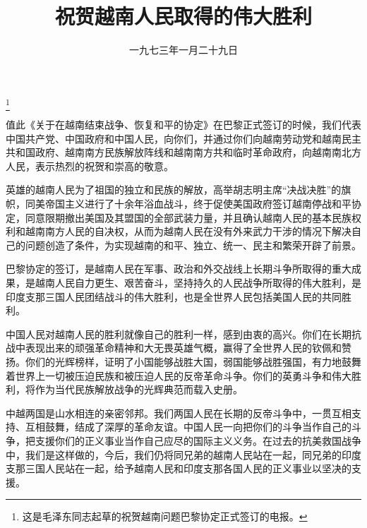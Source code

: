 
\title{祝贺越南人民取得的伟大胜利}
\date{一九七三年一月二十九日}
\thanks{这是毛泽东同志起草的祝贺越南问题巴黎协定正式签订的电报。}
\maketitle










值此《关于在越南结束战争、恢复和平的协定》在巴黎正式签订的时候，我们代表中国共产党、中国政府和中国人民，向你们，并通过你们向越南劳动党和越南民主共和国政府、越南南方民族解放阵线和越南南方共和临时革命政府，向越南南北方人民，表示热烈的祝贺和崇高的敬意。

英雄的越南人民为了祖国的独立和民族的解放，高举胡志明主席“决战决胜”的旗帜，同美帝国主义进行了十余年浴血战斗，终于促使美国政府签订越南停战和平协定，同意限期撤出美国及其盟国的全部武装力量，并且确认越南人民的基本民族权利和越南南方人民的自决权，从而为越南人民在没有外来武力干涉的情况下解决自己的问题创造了条件，为实现越南的和平、独立、统一、民主和繁荣开辟了前景。

巴黎协定的签订，是越南人民在军事、政治和外交战线上长期斗争所取得的重大成果，是越南人民自力更生、艰苦奋斗，坚持持久的人民战争所取得的伟大胜利，是印度支那三国人民团结战斗的伟大胜利，也是全世界人民包括美国人民的共同胜利。

中国人民对越南人民的胜利就像自己的胜利一样，感到由衷的高兴。你们在长期抗战中表现出来的顽强革命精神和大无畏英雄气概，赢得了全世界人民的钦佩和赞扬。你们的光辉榜样，证明了小国能够战胜大国，弱国能够战胜强国，有力地鼓舞着世界上一切被压迫民族和被压迫人民的反帝革命斗争。你们的英勇斗争和伟大胜利，将作为当代民族解放战争的光辉典范而载入史册。

中越两国是山水相连的亲密邻邦。我们两国人民在长期的反帝斗争中，一贯互相支持、互相鼓舞，结成了深厚的革命友谊。中国人民一向把你们的斗争当作自己的斗争，把支援你们的正义事业当作自己应尽的国际主义义务。在过去的抗美救国战争中，我们是这样做的，今后，我们仍将同兄弟的越南人民站在一起，同兄弟的印度支那三国人民站在一起，给予越南人民和印度支那各国人民的正义事业以坚决的支援。

